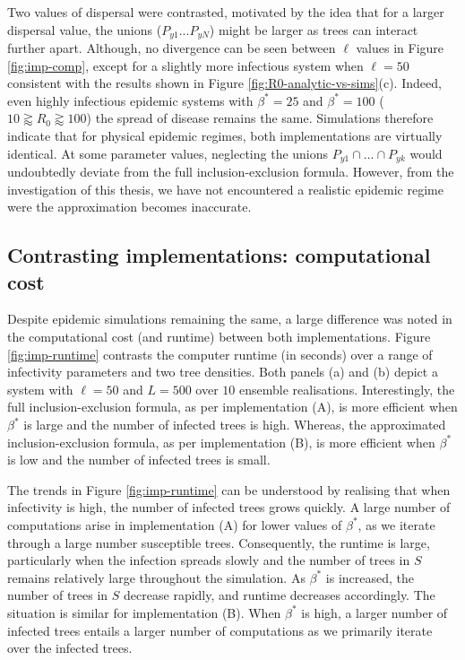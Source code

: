 Two values of dispersal were contrasted, motivated by the idea that for a larger dispersal value, the unions ($P_{y1}...P_{yN}$) might be larger as trees can interact further apart. 
Although, no divergence can be seen between $\ell$ values in Figure \ref{fig:imp-comp}, except for a slightly more infectious system when $\ell=50$\textemdash consistent with the results shown in Figure \ref{fig:R0-analytic-vs-sims}(c).
Indeed, even highly infectious epidemic systems with $\beta^*=25$ and $\beta^*=100$ ($10 \gtrapprox R_0 \gtrapprox 100$) the spread of disease remains the same. 
Simulations therefore indicate that for physical epidemic regimes, both implementations are virtually identical. 
At some parameter values, neglecting the unions $P_{y1} \cap ... \cap P_{yk}$ would undoubtedly deviate from the full inclusion-exclusion formula. 
However, from the investigation of this thesis, we have not encountered a realistic epidemic regime were the approximation becomes inaccurate.

\subsection{Contrasting implementations: computational cost}

Despite epidemic simulations remaining the same, a large difference was noted in the computational cost (and runtime) between both implementations.
Figure \ref{fig:imp-runtime} contrasts the computer runtime (in seconds) over a range of infectivity parameters and two tree densities.
Both panels (a) and (b) depict a system with $\ell=50$ and $L=500$ over $10$ ensemble realisations. 
Interestingly, the full inclusion-exclusion formula, as per implementation (A), is more efficient when $\beta^*$ is large and the number of infected trees is high.
Whereas, the approximated inclusion-exclusion formula, as per implementation (B), is more efficient when $\beta^*$ is low and the number of infected trees is small.

The trends in Figure \ref{fig:imp-runtime} can be understood by realising that when infectivity is high, the number of infected trees grows quickly. 
A large number of computations arise in implementation (A) for lower values of $\beta^*$, as we iterate through a large number susceptible trees.
Consequently, the runtime is large, particularly when the infection spreads slowly and the number of trees in $S$ remains relatively large throughout the simulation.
As $\beta^*$ is increased, the number of trees in $S$ decrease rapidly, and runtime decreases accordingly. 
The situation is similar for implementation (B). 
When $\beta^*$ is high, a larger number of infected trees entails a larger number of computations as we primarily iterate over the infected trees.

